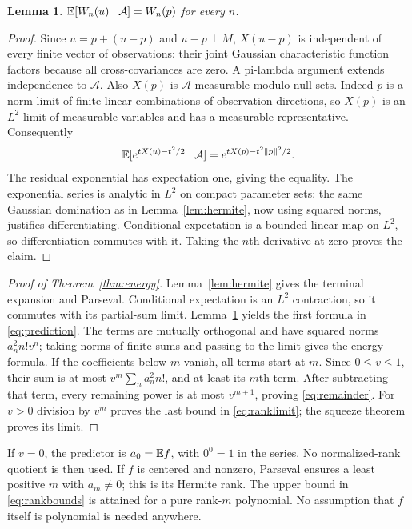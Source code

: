 \documentclass[11pt]{article}
\newtheorem{lemma}[theorem]{Lemma}
\begin{document}
\begin{lemma}\label{lem:conditional}
$\mathbb E[W_n(u)\mid\mathcal A]=W_n(p)$ for every $n$.
\end{lemma}
\begin{proof}
Since $u=p+(u-p)$ and $u-p\perp M$, $X(u-p)$ is independent of every
finite vector of observations: their joint Gaussian characteristic
function factors because all cross-covariances are zero. A pi-lambda
argument extends independence to $\mathcal A$. Also $X(p)$ is
$\mathcal A$-measurable modulo null sets. Indeed $p$ is a norm limit of
finite linear combinations of observation directions, so $X(p)$ is an
$L^2$ limit of measurable variables and has a measurable representative.
Consequently
\[
 \mathbb E[e^{tX(u)-t^2/2}\mid\mathcal A]
 =e^{tX(p)-t^2\|p\|^2/2}.
\]
The residual exponential has expectation one, giving the equality.
The exponential series is analytic in $L^2$ on compact parameter sets:
the same Gaussian domination as in Lemma~\ref{lem:hermite}, now using
squared norms, justifies differentiating. Conditional expectation is a
bounded linear map on $L^2$, so differentiation commutes with it.
Taking the $n$th derivative at zero proves the claim.
\end{proof}

\begin{proof}[Proof of Theorem~\ref{thm:energy}]
Lemma~\ref{lem:hermite} gives the terminal expansion and Parseval.
Conditional expectation is an $L^2$ contraction, so it commutes with
its partial-sum limit. Lemma~\ref{lem:conditional} yields the first
formula in \eqref{eq:prediction}. The terms are mutually orthogonal
and have squared norms $a_n^2n!v^n$; taking norms of finite sums and
passing to the limit gives the energy formula.
If the coefficients below $m$ vanish, all terms start at $m$. Since
$0\leq v\leq1$, their sum is at most $v^m\sum_n a_n^2n!$, and at
least its $m$th term. After subtracting that term, every remaining
power is at most $v^{m+1}$, proving \eqref{eq:remainder}. For $v>0$
division by $v^m$ proves the last bound in \eqref{eq:ranklimit}; the
squeeze theorem proves its limit.
\end{proof}

If $v=0$, the predictor is $a_0=\mathbb E f$, with $0^0=1$ in the series.
No normalized-rank quotient is then used. If $f$ is centered and
nonzero, Parseval ensures a least positive $m$ with $a_m\ne0$; this
is its Hermite rank. The upper bound in \eqref{eq:rankbounds} is
attained for a pure rank-$m$ polynomial. No assumption that $f$ itself
is polynomial is needed anywhere.
\end{document}
